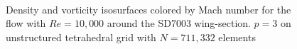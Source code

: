 \begin{figure}[htbp]
\centering
{}
\\

\caption{Density and vorticity isosurfaces colored by Mach number for the flow with $Re = 10,000$ around the SD7003 wing-section. $p=3$ on unstructured tetrahedral grid with $N = 711,332$ elements}
\label{sdwingre10k}
\end{figure}

